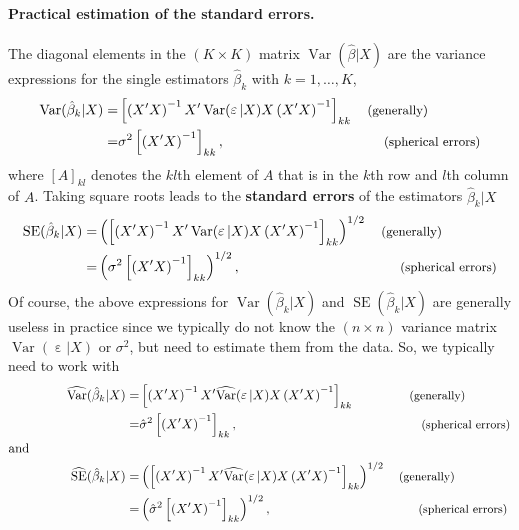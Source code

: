 \documentclass[
  14pt,
]{memoir}
\DeclareMathOperator{\eps}{\varepsilon}
\DeclareMathOperator{\V}{\operatorname{Var}}
\begin{document}
\paragraph*{Practical estimation of the standard errors.}

The diagonal elements in the \((K\times K)\) matrix \(\V(\hat{\beta}|X)\) are the variance expressions for the single estimators \(\hat\beta_k\) with \(k=1,\dots,K\),
\begin{align*}
\V(\hat{\beta}_k|X)=&\left[\left(X^{\prime} X\right)^{-1} X^{\prime} \V(\eps|X) X\left(X^{\prime} X\right)^{-1}\right]_{kk}\quad\small{\text{(generally)}}\\
=&\sigma^2\left[\left(X^{\prime} X\right)^{-1}\right]_{kk},\hspace*{4cm}\small{\text{(spherical errors)}}
\end{align*}
where \([A]_{kl}\) denotes the \(kl\)th element of \(A\) that is in the \(k\)th row and \(l\)th column of \(A\). Taking square roots leads to the \textbf{standard errors} of the estimators \(\hat\beta_k|X\)
\begin{align*}
\operatorname{SE}(\hat{\beta}_k|X)=&\left(\left[\left(X^{\prime} X\right)^{-1} X^{\prime} \V(\eps|X) X\left(X^{\prime} X\right)^{-1}\right]_{kk}\right)^{1/2}\quad\small{\text{(generally)}}\\
=&\left(\sigma^2\left[\left(X^{\prime} X\right)^{-1}\right]_{kk}\right)^{1/2},\hspace*{4cm}\small{\text{(spherical errors)}}
\end{align*}
Of course, the above expressions for \(\V(\hat{\beta}_k|X)\) and \(\operatorname{SE}(\hat{\beta}_k|X)\) are generally useless in practice since we typically do not know the \((n\times n)\) variance matrix \(\V(\eps|X)\) or \(\sigma^2\), but need to estimate them from the data. So, we typically need to work with
\begin{align*}
\widehat{\V}(\hat{\beta}_k|X)=&\left[\left(X^{\prime} X\right)^{-1} X^{\prime} \widehat{\V}(\eps|X) X\left(X^{\prime} X\right)^{-1}\right]_{kk}\hspace*{1.5cm}\small{\text{(generally)}}\\
=&\hat\sigma^2\left[\left(X^{\prime} X\right)^{-1}\right]_{kk},\hspace*{5cm}\small{\text{(spherical errors)}}\\
\text{and}\hspace*{3cm}&\\
\widehat{\operatorname{SE}}(\hat{\beta}_k|X)=&\left(\left[\left(X^{\prime} X\right)^{-1} X^{\prime} \widehat{\V}(\eps|X) X\left(X^{\prime} X\right)^{-1}\right]_{kk}\right)^{1/2}\quad\small{\text{(generally)}}\\
=&\left(\hat\sigma^2\left[\left(X^{\prime}X\right)^{-1}\right]_{kk}\right)^{1/2},\hspace*{4cm}\small{\text{(spherical errors)}}
\end{align*}
\end{document}
